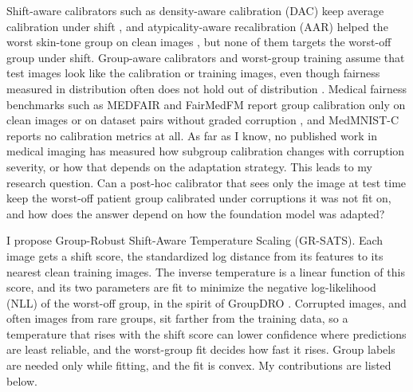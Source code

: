 \documentclass[sigconf,nonacm]{acmart}
\begin{document}
Shift-aware calibrators such as density-aware calibration (DAC) keep average calibration under shift \cite{tomani2021posthoc,yu2022multidomain,tomani2023dac}, and atypicality-aware recalibration (AAR) helped the worst skin-tone group on clean images \cite{yuksekgonul2023atypicality}, but none of them targets the worst-off group under shift. Group-aware calibrators \cite{hebertjohnson2018multicalibration,salvador2022faircal} and worst-group training \cite{sagawa2020groupdro,shui2023clusterfocal} assume that test images look like the calibration or training images, even though fairness measured in distribution often does not hold out of distribution \cite{schrouff2022diagnosing,yang2024limits}. Medical fairness benchmarks such as MEDFAIR and FairMedFM report group calibration only on clean images or on dataset pairs without graded corruption \cite{zong2023medfair,jin2024fairmedfm}, and MedMNIST-C \cite{disalvo2024medmnistc} reports no calibration metrics at all. As far as I know, no published work in medical imaging has measured how subgroup calibration changes with corruption severity, or how that depends on the adaptation strategy. This leads to my research question. Can a post-hoc calibrator that sees only the image at test time keep the worst-off patient group calibrated under corruptions it was not fit on, and how does the answer depend on how the foundation model was adapted?

I propose Group-Robust Shift-Aware Temperature Scaling (GR-SATS). Each image gets a shift score, the standardized log distance from its features to its nearest clean training images. The inverse temperature is a linear function of this score, and its two parameters are fit to minimize the negative log-likelihood (NLL) of the worst-off group, in the spirit of GroupDRO \cite{sagawa2020groupdro}. Corrupted images, and often images from rare groups, sit farther from the training data, so a temperature that rises with the shift score can lower confidence where predictions are least reliable, and the worst-group fit decides how fast it rises. Group labels are needed only while fitting, and the fit is convex. My contributions are listed below.
\end{document}
